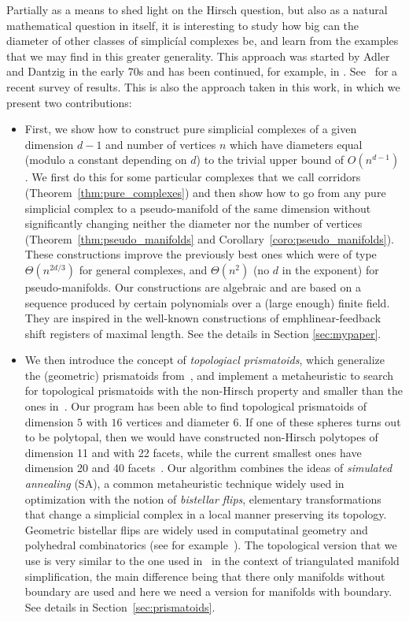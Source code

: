 \documentclass[12pt,a4paper]{article}
\theoremstyle{plain}
\theoremstyle{definition}
\begin{document}
Partially as a means to shed light on the Hirsch question, but also as a natural mathematical question in itself, it is interesting to study how big can the diameter of other classes of simplicíal complexes be, and learn from the examples that we may find in this greater generality. This approach was started by Adler and Dantzig in the early 70s and has been continued, for example, in \cite{ManiWalkup,nonPolytopal}. See~\cite{Santos:progress} for a recent survey of results. This is also the approach taken in this work, in which we present two contributions:

\begin{itemize}
\item First, we show how to construct pure simplicial complexes of a given dimension $d-1$ and number of vertices $n$ which have diameters equal (modulo a constant depending on $d$) to the trivial upper bound of $O(n^{d-1})$. We first do this for some particular complexes that we call corridors 
(Theorem~\ref{thm:pure_complexes}) and then show how to go from any pure simplicial complex to a pseudo-manifold of the same dimension without significantly changing neither the diameter nor the number of vertices (Theorem~\ref{thm:pseudo_manifolds} and Corollary~\ref{coro:pseudo_manifolds}). These constructions improve the previously best ones which were of type $\Theta(n^{2d/3})$ for general complexes, and $\Theta(n^2)$ (no $d$ in the exponent) for pseudo-manifolds. Our constructions are algebraic and are based on a sequence produced by certain polynomials over a (large enough) finite field. They are inspired in the well-known constructions of emph{linear-feedback shift registers} of maximal length. See the details in Section \ref{sec:mypaper}.

\item We then introduce the concept of \emph{topologiacl prismatoids}, which generalize the (geometric) prismatoids from~\cite{counterexample,improvement}, and implement a metaheuristic to search for topological prismatoids with the non-Hirsch property and smaller than the ones in~\cite{counterexample,improvement}. Our program has been able to find topological prismatoids of dimension $5$ with $16$ vertices and diameter $6$. If one of these spheres turns out to be polytopal, then we would have constructed non-Hirsch polytopes of dimension 11 and with 22 facets, while the current smallest ones have dimension 20 and 40 facets~\cite{improvement}. Our algorithm combines the ideas of  \emph{simulated annealing} (SA), a common metaheuristic technique widely used in optimization with the notion of \emph{bistellar flips}, elementary transformations that change a simplicial complex in a local manner preserving its topology. Geometric bistellar flips are widely used in computatinal geometry and polyhedral combinatorics (see for example~\cite{SantosFlips}). The topological version that we use is very similar to the one used in~\cite{Lutz} in the context of triangulated manifold simplification, the main difference being that there only manifolds without boundary are used and here we need a version for manifolds with boundary. See details in Section~\ref{sec:prismatoids}.
\end{itemize}
\end{document}
